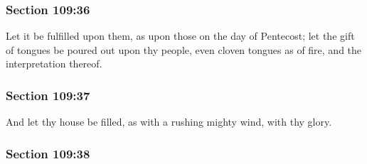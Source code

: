 
	\subsubsection{Section 109:36} %
		\label{DC109-36}

		Let it be fulfilled upon them, as upon those on the day of Pentecost; let the gift of tongues be poured out upon thy people, even cloven tongues as of fire, and the interpretation thereof.


	\subsubsection{Section 109:37} %
		\label{DC109-37}

		And let thy house be filled, as with a rushing mighty wind, with thy glory.


	\subsubsection{Section 109:38} %
		\label{DC109-38}

